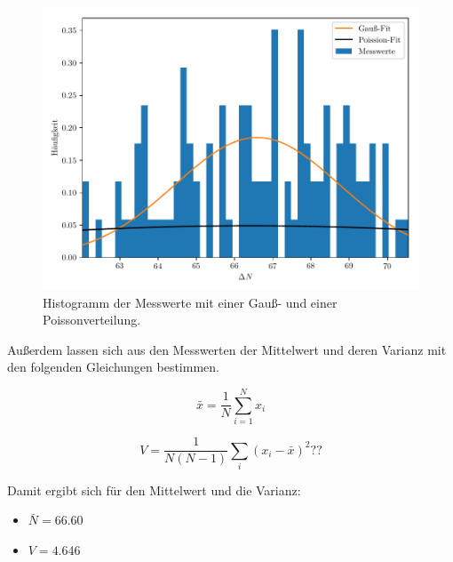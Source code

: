 \begin{figure}[H]
  \centering
  \includegraphics{plot5.pdf}
  \caption{Histogramm der Messwerte mit einer Gauß- und einer Poissonverteilung.}
  \label{abb:6}
\end{figure}

Außerdem lassen sich aus den Messwerten der Mittelwert und deren Varianz mit den
folgenden Gleichungen bestimmen.

\begin{equation*}
    \bar{x} = \frac{1}{N} \sum_{i=1}^{N} x_i
\end{equation*}

\begin{equation*}
  V = \frac{1}{N(N-1)} \sum_{i}(x_i-\bar{x})^2??
\end{equation*}

Damit ergibt sich für den Mittelwert und die Varianz:

\begin{itemize}
  \item $\bar{N} = \num{66.60}$
  \item $V = \num{4.646}$
\end{itemize}
